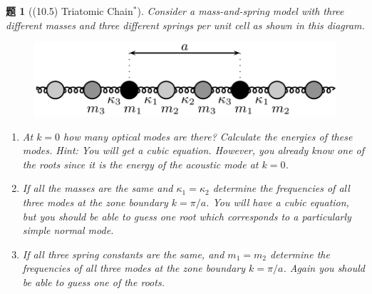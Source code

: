 \documentclass[UTF8,10pt,a4paper]{article}
\theoremstyle{Problem}
\newtheorem{prob}{题}
\theoremstyle{Solution}
\begin{document}
\begin{prob}[(10.5) Triatomic Chain$^*$]
    Consider a mass-and-spring model with three different masses and three different springs per unit cell as shown in this diagram.
    \begin{figure}[h]
        \centering
        \includegraphics[width=.4\textwidth]{2.png}
    \end{figure}
    \begin{enumerate}
        \item[(a)] At $k=0$ how many optical modes are there? Calculate the energies of these modes. Hint: You will get a cubic equation. However, you already know one of the roots since it is the energy of the acoustic mode at $k=0$.
        \item[(b)$^*$] If all the masses are the same and $\kappa_1=\kappa_2$ determine the frequencies of all three modes at the zone boundary $k=\pi/a$. You will have a cubic equation, but you should be able to guess one root which corresponds to a particularly simple normal mode.
        \item[(c)$^*$] If all three spring constants are the same, and $m_1=m_2$ determine the frequencies of all three modes at the zone boundary $k=\pi/a$. Again you should be able to guess one of the roots.
    \end{enumerate}
\end{prob}
\end{document}
